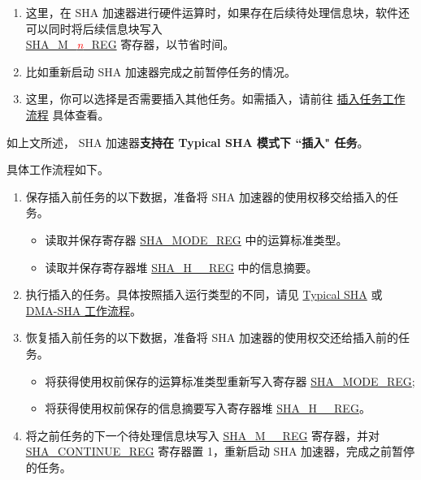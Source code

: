 \documentclass[main\_\_CN.tex]{subfiles}
\begin{document}
\begin{tiplisting}\label{others:sha-note-typical-sha}
\vspace{-2.5em}
\begin{enumerate}
\item 这里，在 SHA 加速器进行硬件运算时，如果存在后续待处理信息块，软件还可以同时将后续信息块写入 \\ \hyperref[regdesc:SHAMNREG]{SHA\_M\_\textcolor{red}{\it{n}}\_REG} 寄存器，以节省时间。
\item 比如重新启动 SHA 加速器完成之前暂停任务的情况。
\item 这里，你可以选择是否需要插入其他任务。如需插入，请前往 \hyperref[others:sha-interleaved]{插入任务工作流程} 具体查看。
\end{enumerate} 
\end{tiplisting}

\label{others:sha-interleaved}如上文所述，\chipname{} SHA 加速器\textbf{支持在 Typical SHA 模式下 ``插入" 任务}。 

具体工作流程如下。

\begin{enumerate}
    \item 保存插入前任务的以下数据，准备将 SHA 加速器的使用权移交给插入的任务。
        \begin{itemize}
            \item 读取并保存寄存器 \hyperref[regdesc:SHAMODEREG]{SHA\_MODE\_REG} 中的运算标准类型。
            \item 读取并保存寄存器堆 \hyperref[regdesc:SHAHNREG]{SHA\_H\_\_REG} 中的信息摘要。
        \end{itemize}
    \item 执行插入的任务。具体按照插入运行类型的不同，请见 \hyperref[sec:sha-typical-sha]{Typical SHA} 或 \hyperref[sec:sha-dma-sha]{DMA-SHA 工作流程}。
    \item 恢复插入前任务的以下数据，准备将 SHA 加速器的使用权交还给插入前的任务。
        \begin{itemize}
            \item 将获得使用权前保存的运算标准类型重新写入寄存器 \hyperref[regdesc:SHAMODEREG]{SHA\_MODE\_REG};
            \item 将获得使用权前保存的信息摘要写入寄存器堆 \hyperref[regdesc:SHAHNREG]{SHA\_H\_\_REG}。
        \end{itemize}
    \item 将之前任务的下一个待处理信息块写入 \hyperref[regdesc:SHAMNREG]{SHA\_M\_\_REG} 寄存器，并对 \hyperref[regdesc:SHACONTINUEREG]{SHA\_CONTINUE\_REG} 寄存器置 1，重新启动 SHA 加速器，完成之前暂停的任务。
\end{enumerate}
\end{document}
